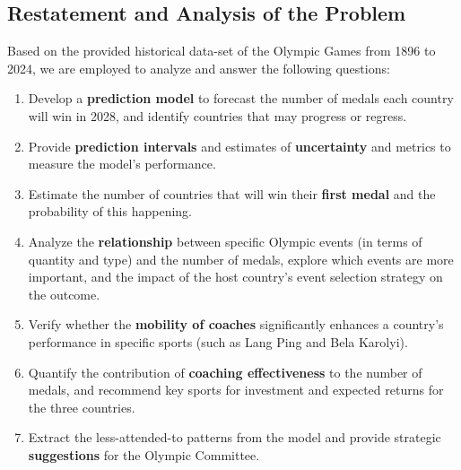 \documentclass{mcmthesis}
\begin{document}
	\subsection{Restatement and Analysis of the Problem}
	Based on the provided historical data-set of the Olympic Games from 1896 to 2024, we are employed to analyze and answer the following questions:
	\begin{enumerate}
		\item 
		Develop a \textbf{prediction model} to forecast the number of medals each country will win in 2028, and identify countries that may progress or regress. 
		\item 
		Provide \textbf{prediction intervals} and estimates of \textbf{uncertainty} and metrics to measure the model's performance.
		\item 
		Estimate the number of countries that will win their \textbf{first medal} and the probability of this happening.
		\item 
		Analyze the \textbf{relationship} between specific Olympic events (in terms of quantity and type) and the number of medals, explore which events are more important, and the impact of the host country's event selection strategy on the outcome.
		\item 
		Verify whether the \textbf{mobility of coaches} significantly enhances a country's performance in specific sports (such as Lang Ping and Bela Karolyi).
		\item 
		Quantify the contribution of\textbf{ coaching effectiveness} to the number of medals, and recommend key sports for investment and expected returns for the three countries.
		\item 
		Extract the less-attended-to patterns from the model and provide strategic \textbf{suggestions} for the Olympic Committee.
	\end{enumerate}
	
	
	
	
	
	
	
	
	
	
	
	
\end{document}
